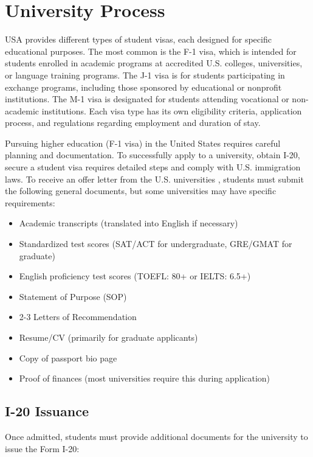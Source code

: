 \section{University Process}
USA provides different types of student visas, each designed for specific educational purposes. The most common is the F-1 visa, which is intended for students enrolled in academic programs at accredited U.S. colleges, universities, or language training programs. The J-1 visa is for students participating in exchange programs, including those sponsored by educational or nonprofit institutions. The M-1 visa is designated for students attending vocational or non-academic institutions. Each visa type has its own eligibility criteria, application process, and regulations regarding employment and duration of stay.




Pursuing higher education (F-1 visa) in the United States requires careful planning and documentation. To successfully apply to a university, obtain I-20, secure a student visa requires detailed steps and comply with U.S. immigration laws.
To receive an offer letter from the U.S. universities , students must submit the following general documents, but some universities may have specific requirements:

\begin{itemize}[label=--]
    \item Academic transcripts (translated into English if necessary)
    \item Standardized test scores (SAT/ACT for undergraduate, GRE/GMAT for graduate)
    \item English proficiency test scores (TOEFL: 80+ or IELTS: 6.5+)
    \item Statement of Purpose (SOP)
    \item 2-3 Letters of Recommendation
    \item Resume/CV (primarily for graduate applicants)
    \item Copy of passport bio page
    \item Proof of finances (most universities require this during application)
\end{itemize}

\subsection{I-20 Issuance}
Once admitted, students must provide additional documents for the university to issue the Form I-20:


